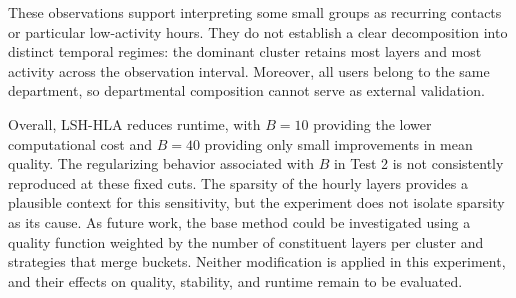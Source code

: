 These observations support interpreting some small groups as recurring contacts or particular low-activity hours. They do not establish a clear decomposition into distinct temporal regimes: the dominant cluster retains most layers and most activity across the observation interval. Moreover, all users belong to the same department, so departmental composition cannot serve as external validation.

Overall, LSH-HLA reduces runtime, with $B=10$ providing the lower computational cost and $B=40$ providing only small improvements in mean quality. The regularizing behavior associated with $B$ in Test 2 is not consistently reproduced at these fixed cuts. The sparsity of the hourly layers provides a plausible context for this sensitivity, but the experiment does not isolate sparsity as its cause. As future work, the base method could be investigated using a quality function weighted by the number of constituent layers per cluster and strategies that merge buckets. Neither modification is applied in this experiment, and their effects on quality, stability, and runtime remain to be evaluated.
